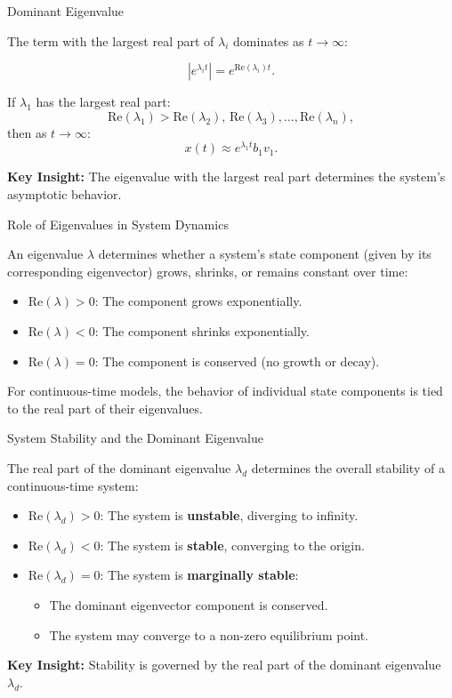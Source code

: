 \documentclass{beamer}
\begin{document}
\begin{frame}{Dominant Eigenvalue}

The term with the largest real part of \( \lambda_i \) dominates as \( t \to \infty \):

\[
|e^{\lambda_i t}| = e^{\mathrm{Re}(\lambda_i) t}.
\]

If \( \lambda_1 \) has the largest real part:
\[
\mathrm{Re}(\lambda_1) > \mathrm{Re}(\lambda_2), \, \mathrm{Re}(\lambda_3), \dots, \mathrm{Re}(\lambda_n),
\]
then as \( t \to \infty \):
\[
x(t) \approx e^{\lambda_1 t} b_1 v_1.
\]

\textbf{Key Insight:} The eigenvalue with the largest real part determines the system's asymptotic behavior.

\end{frame}

\begin{frame}{Role of Eigenvalues in System Dynamics}

An eigenvalue \( \lambda \) determines whether a system's state component (given by its corresponding eigenvector) grows, shrinks, or remains constant over time:

\begin{itemize}
    \item \(\mathrm{Re}(\lambda) > 0\): The component grows exponentially.
    \item \(\mathrm{Re}(\lambda) < 0\): The component shrinks exponentially.
    \item \(\mathrm{Re}(\lambda) = 0\): The component is conserved (no growth or decay).
\end{itemize}

For continuous-time models, the behavior of individual state components is tied to the real part of their eigenvalues.

\end{frame}

\begin{frame}{System Stability and the Dominant Eigenvalue}

The real part of the dominant eigenvalue \( \lambda_d \) determines the overall stability of a continuous-time system:

\begin{itemize}
    \item \(\mathrm{Re}(\lambda_d) > 0\): The system is \textbf{unstable}, diverging to infinity.
    \item \(\mathrm{Re}(\lambda_d) < 0\): The system is \textbf{stable}, converging to the origin.
    \item \(\mathrm{Re}(\lambda_d) = 0\): The system is \textbf{marginally stable}:
    \begin{itemize}
        \item The dominant eigenvector component is conserved.
        \item The system may converge to a non-zero equilibrium point.
    \end{itemize}
\end{itemize}

\textbf{Key Insight:} Stability is governed by the real part of the dominant eigenvalue \( \lambda_d \).

\end{frame}
\end{document}

